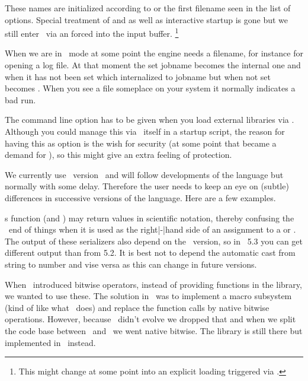 These names are initialized according to  or the first filename
seen in the list of options. Special treatment of \type {&} and \type {*} as well
as interactive startup is gone but we still enter \TEX\ via an forced \type {}
into the input buffer. \footnote {This might change at some point into an explicit
loading triggered via \LUA.}

When we are in \TEX\ mode at some point the engine needs a filename, for instance
for opening a log file. At that moment the set jobname becomes the internal one
and when it has not been set which internalized to jobname but when not set
becomes . When you see a  file someplace on your
system it normally indicates a bad run.


The command line option  has to be given when you load
external libraries via \LUA. Although you could manage this via \LUA\ itself in a
startup script, the reason for having this as option is the wish for security (at
some point that became a demand for \LUATEX), so this might give an extra feeling
of protection.

\stopsubsection

\startsection[title={\LUA\ behaviour}]

\startsubsection[title={The \LUA\ version}]

We currently use \LUA\ version \luaversion\ and will follow developments of the
language but normally with some delay. Therefore the user needs to keep an eye on
(subtle) differences in successive versions of the language. Here are a few
examples.

\LUA s  function (and ) may return values in
scientific notation, thereby confusing the \TEX\ end of things when it is used as
the right|-|hand side of an assignment to a \type {\dimen} or \type {\count}. The
output of these serializers also depend on the \LUA\ version, so in \LUA\ 5.3 you
can get different output than from 5.2. It is best not to depend the automatic
cast from string to number and vise versa as this can change in future versions.

When \LUA\ introduced bitwise operators, instead of providing functions in the
 library, we wanted to use these. The solution in \CONTEXT\ was to
implement a macro subsystem (kind of like what \CCODE\ does) and replace the
function calls by native bitwise operations. However, because \LUAJITTEX\ didn't
evolve we dropped that and when we split the code base between \MKIV\ and \MKXL\
we went native bitwise. The  library is still there but implemented
in \LUA\ instead.

